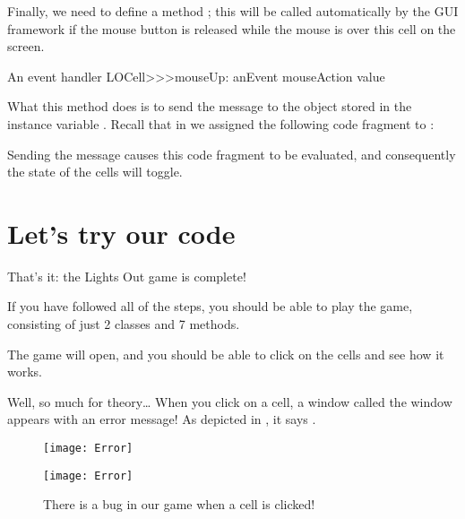 \documentclass[a4paper,10pt,twoside]{book}
\begin{document}
{

Finally, we need to define a method ; this will be called automatically by the GUI framework if the mouse button is released while the mouse is over this cell on the screen.

\begin{method}[sbecellmouseup]{An event handler}
LOCell>>>mouseUp: anEvent
   mouseAction value
\end{method}


What this method does is to send the message  to the object stored in the instance variable . 
Recall that in  we assigned the following code fragment to :


\noindent
Sending the  message causes this code fragment to be evaluated, and consequently the state of the cells will toggle.

\section{Let's try our code}

That's it: the Lights Out game is complete!

If you have followed all of the steps, you should be able to play the game, consisting of just 2 classes and 7 methods.


The game will open, and you should be able to click on the cells and see how it works.

Well, so much for theory\ldots{}
When you click on a cell, a  window called the window appears with an error message!
As depicted in , it says .

\begin{figure}[ht]
\ifluluelse
	{\centerline{\texttt{[image: Error]}}}
	{\centerline{\texttt{[image: Error]}}}
\caption{There is a bug in our game when a cell is clicked!
}
\end{figure}

}
\end{document}
